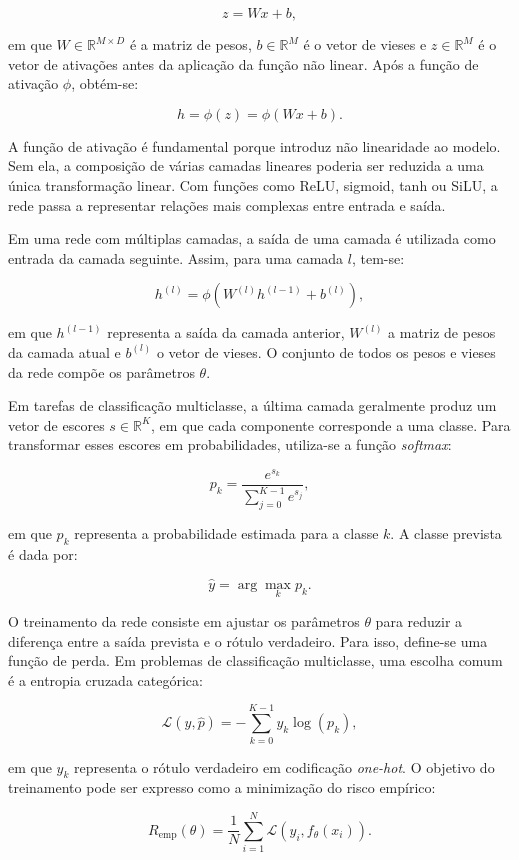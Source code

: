 \documentclass[
    12pt,
    openright,
    oneside,
    a4paper,
    english,
    brazil
]{abntex2}
\begin{document}
\[
z = Wx + b,
\]

em que \(W \in \mathbb{R}^{M \times D}\) é a matriz de pesos, \(b \in \mathbb{R}^{M}\) é o vetor de vieses e \(z \in \mathbb{R}^{M}\) é o vetor de ativações antes da aplicação da função não linear. Após a função de ativação \(\phi\), obtém-se:

\[
h = \phi(z) = \phi(Wx + b).
\]

A função de ativação é fundamental porque introduz não linearidade ao modelo. Sem ela, a composição de várias camadas lineares poderia ser reduzida a uma única transformação linear. Com funções como ReLU, sigmoid, tanh ou SiLU, a rede passa a representar relações mais complexas entre entrada e saída.

Em uma rede com múltiplas camadas, a saída de uma camada é utilizada como entrada da camada seguinte. Assim, para uma camada \(l\), tem-se:

\[
h^{(l)} = \phi\left(W^{(l)}h^{(l-1)} + b^{(l)}\right),
\]

em que \(h^{(l-1)}\) representa a saída da camada anterior, \(W^{(l)}\) a matriz de pesos da camada atual e \(b^{(l)}\) o vetor de vieses. O conjunto de todos os pesos e vieses da rede compõe os parâmetros \(\theta\).

Em tarefas de classificação multiclasse, a última camada geralmente produz um vetor de escores \(s \in \mathbb{R}^{K}\), em que cada componente corresponde a uma classe. Para transformar esses escores em probabilidades, utiliza-se a função \textit{softmax}:

\[
p_k =
\frac{e^{s_k}}
{\sum_{j=0}^{K-1} e^{s_j}},
\]

em que \(p_k\) representa a probabilidade estimada para a classe \(k\). A classe prevista é dada por:

\[
\hat{y} = \arg\max_k p_k.
\]

O treinamento da rede consiste em ajustar os parâmetros \(\theta\) para reduzir a diferença entre a saída prevista e o rótulo verdadeiro. Para isso, define-se uma função de perda. Em problemas de classificação multiclasse, uma escolha comum é a entropia cruzada categórica:

\[
\mathcal{L}(y,\hat{p}) =
-\sum_{k=0}^{K-1} y_k \log(p_k),
\]

em que \(y_k\) representa o rótulo verdadeiro em codificação \textit{one-hot}. O objetivo do treinamento pode ser expresso como a minimização do risco empírico:

\[
R_{\text{emp}}(\theta) =
\frac{1}{N}
\sum_{i=1}^{N}
\mathcal{L}(y_i, f_{\theta}(x_i)).
\]
\end{document}
